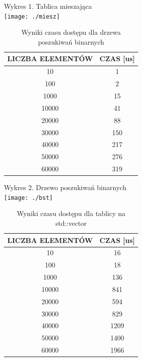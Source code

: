 \documentclass[12pt,a4paper]{article}
\begin{document}
Wykres 1. Tablica mieszająca\\

\texttt{[image: ./miesz]}

\newpage

\begin{table}[t]
\caption{Wyniki czasu dostępu dla drzewa poszukiwań binarnych}
\label{BST}
\centering
\begin{tabular}{|c|c|}
  \hline 
  LICZBA ELEMENTÓW & CZAS [us]\\
  \hline
  10 & 1 \\
  \hline
  100 & 2 \\
  \hline
    1000 & 15 \\
    \hline
      10000 & 41 \\
      \hline
        20000 & 88 \\
        \hline
          30000 & 150 \\
          \hline
            40000 & 217 \\
            \hline
              50000 & 276 \\
              \hline
                60000 & 319 \\
  \hline
\end{tabular} 
\end{table}



Wykres 2. Drzewo poszukiwań binarnych\\

\texttt{[image: ./bst]}

\newpage

\begin{table}[t]
\caption{Wyniki czasu dostępu dla tablicy na std::vector}
\label{asoc}
\centering
\begin{tabular}{|c|c|}
  \hline 
  LICZBA ELEMENTÓW & CZAS [us]\\
  \hline
  10 & 16 \\
  \hline
  100 & 18 \\
  \hline
    1000 & 136 \\
    \hline
      10000 & 841 \\
      \hline
        20000 & 594 \\
        \hline
          30000 & 829 \\
          \hline
            40000 & 1209 \\
            \hline
              50000 & 1400 \\
              \hline
                60000 & 1966 \\
  \hline
\end{tabular} 
\end{table}
\end{document}

